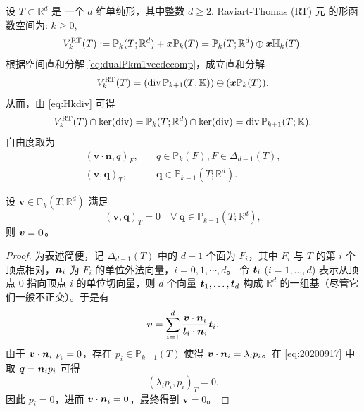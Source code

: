 设 $T\subset \mathbb R^d$ 是 一个 $d$ 维单纯形，其中整数 $d\geq2$. Raviart-Thomas (RT) 元 \cite{RaviartThomas1977,Nedelec1980,ChenHuang2022} 的形函数空间为: $k\geq0$,
$$
V_k^{\rm RT}(T):= \mathbb P_{k}(T; \mathbb R^d) + \boldsymbol x\mathbb P_{k}(T)=\mathbb P_{k}(T; \mathbb R^d) \oplus \boldsymbol x\mathbb H_{k}(T).
$$ 
根据空间直和分解 \eqref{eq:dualPkm1vecdecomp}，成立直和分解
$$
V_k^{\rm RT}(T)= (\div\mathbb P_{k+1}(T;\mathbb K))\oplus (\boldsymbol x\mathbb P_{k}(T)).
$$ 
从而，由 \eqref{eq:Hkdiv} 可得 
$$
V_k^{\rm RT}(T)\cap\ker(\div)=\mathbb P_{k}(T; \mathbb R^d)\cap\ker(\div)=\div\mathbb P_{k+1}(T;\mathbb K).
$$
自由度取为
\begin{subequations}\label{RTfemdof}
\begin{align}
(\boldsymbol v\cdot\boldsymbol  n, q)_F, & \quad q\in\mathbb P_{k}(F),  F\in\Delta_{d-1}(T),\label{RTfemdof1}\\
(\boldsymbol v, \boldsymbol q)_T, & \quad \boldsymbol q\in\mathbb P_{k-1}(T; \mathbb R^d). \label{RTfemdof2}
\end{align}
\end{subequations}

\begin{lemma}\label{lem:20250930}
设 $\boldsymbol{v}\in \mathbb P_{k}(T; \mathbb R^d)$ 满足
\begin{equation}\label{eq:20200917}
(\boldsymbol v, \boldsymbol q)_T =0 \quad \forall~\boldsymbol q\in\mathbb P_{k-1}(T; \mathbb R^d),
\end{equation}
则 $\boldsymbol v=\bs 0$。
\end{lemma}
\begin{proof}
为表述简便，记 $\Delta_{d-1}(T)$ 中的 $d+1$ 个面为 $F_i$，其中 $F_i$ 与 $T$ 的第 $i$ 个顶点相对，$\bs n_i$ 为 $F_i$ 的单位外法向量，$i=0,1,\cdots,d$。
令 $\bs t_i$ ($i=1,\ldots,d$) 表示从顶点 $0$ 指向顶点 $i$ 的单位切向量，则 $d$ 个向量 ${\bs t_1, \ldots, \bs t_d}$ 构成 $\mathbb R^d$ 的一组基（尽管它们一般不正交）。于是有
\[
\bs v=\sum_{i=1}^d\frac{\bs v\cdot\bs n_i}{\bs t_i\cdot\bs n_i}\bs t_i.
\]
由于 $\bs v\cdot\bs n_i|_{F_i}=0$，存在 $p_i\in\mathbb P_{k-1}(T)$ 使得 $\bs v\cdot\bs n_i=\lambda_ip_i$。在 \eqref{eq:20200917} 中取 $\bs q=\bs n_ip_i$ 可得
\[
(\lambda_ip_i, p_i)_T =0.
\]
因此 $p_i=0$，进而 $\boldsymbol v\cdot\bs n_i=0$，最终得到 $\boldsymbol v= 0$。
\end{proof}


